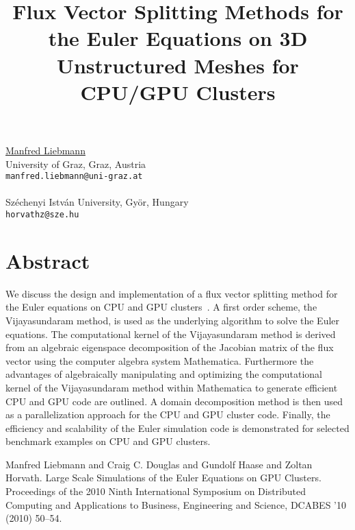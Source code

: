 \title{Flux Vector Splitting Methods for the Euler Equations on 3D Unstructured Meshes for CPU/GPU Clusters}
\author{}  \institute{}
\maketitle
\begin{center}
{\large \underline{Manfred Liebmann}}\\
University of Graz, Graz, Austria\\
{\tt manfred.liebmann@uni-graz.at}
\\ \vspace{4mm}{\large Zolt\'an Horv\'ath}\\
Sz\'echenyi Istv\'an University, Gy\"or, Hungary\\
{\tt horvathz@sze.hu}

\end{center}

\section*{Abstract}

We discuss the design and implementation of a flux vector splitting method for the Euler equations on CPU and GPU clusters~\cite{liebmann}. A first order scheme, the Vijayasundaram method, is used as the underlying algorithm to solve the Euler equations. The computational kernel of the Vijayasundaram method is derived from an algebraic eigenspace decomposition of the Jacobian matrix of the flux vector using the computer algebra system Mathematica. Furthermore the advantages of algebraically manipulating and optimizing the computational kernel of the Vijayasundaram method within Mathematica to generate efficient CPU and GPU code are outlined. A domain decomposition method is then used as a parallelization approach for the CPU and GPU cluster code. Finally, the efficiency and scalability of the Euler simulation code is demonstrated for selected benchmark examples on CPU and GPU clusters.



\begin{thebibliography}{10}

{\sc Manfred Liebmann and Craig C. Douglas and Gundolf Haase and Zoltan Horvath}. {Large Scale Simulations of the Euler Equations on GPU Clusters}. Proceedings of the 2010 Ninth International Symposium on Distributed Computing and Applications to Business, Engineering and Science, DCABES '10 (2010) 50--54.

\end{thebibliography}
